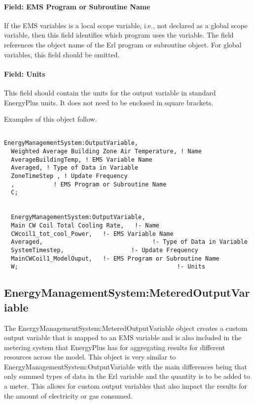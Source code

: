 \paragraph{Field: EMS Program or Subroutine Name}\label{field-ems-program-or-subroutine-name}

If the EMS variables is a local scope variable, i.e., not declared as a global scope variable, then this field identifies which program uses the variable. The field references the object name of the Erl program or subroutine object. For global variables, this field should be omitted.

\paragraph{Field: Units}\label{field-units}

This field should contain the units for the output variable in standard EnergyPlus units. It does not need to be enclosed in square brackets.

Examples of this object follow.

\begin{lstlisting}

EnergyManagementSystem:OutputVariable,
  Weighted Average Building Zone Air Temperature, ! Name
  AverageBuildingTemp, ! EMS Variable Name
  Averaged, ! Type of Data in Variable
  ZoneTimeStep , ! Update Frequency
  ,           ! EMS Program or Subroutine Name
  C;


  EnergyManagementSystem:OutputVariable,
  Main CW Coil Total Cooling Rate,   !- Name
  CWcoil1_tot_cool_Power,   !- EMS Variable Name
  Averaged,                               !- Type of Data in Variable
  SystemTimestep,                   !- Update Frequency
  MainCWCoil1_ModelOuput,   !- EMS Program or Subroutine Name
  W;                                             !- Units
\end{lstlisting}

\subsection{EnergyManagementSystem:MeteredOutputVariable}\label{energymanagementsystemmeteredoutputvariable}

The EnergyManagementSystem:MeteredOutputVariable object creates a custom output variable that is mapped to an EMS variable and is also included in the metering system that EnergyPlus has for aggregating results for different resources across the model. This object is very similar to EnergyManagementSystem:OutputVariable with the main differences being that only summed types of data in the Erl variable and the quantity is to be added to a meter. This allows for custom output variables that also impact the results for the amount of electricity or gas consumed.

